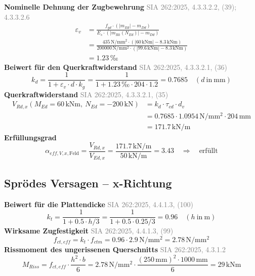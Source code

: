 \documentclass[11pt,a4paper]{article}
\newcommand{\normref}[1]{{\small\textcolor{gray}{#1}}}
\begin{document}
\noindent\textbf{Nominelle Dehnung der Zugbewehrung} \hfill \normref{SIA 262:2025, 4.3.3.2.2, (39); 4.3.3.2.6}
\begin{equation*}
\begin{aligned}
  \varepsilon_v &= \frac{f_{yd} \cdot \left(\left|m_{Ed}\right| - m_{Dd}\right)}{E_s \cdot \left(\left|m_{Rk}(N_{Ed})\right| - m_{Dd}\right)} \\
  &= \frac{435\,\mathrm{N}/\mathrm{mm}^{2} \cdot \left(\left|60\,\mathrm{kNm}\right| - 8.3\,\mathrm{kNm}\right)}{200000\,\mathrm{N}/\mathrm{mm}^{2} \cdot \left(\left|99.6\,\mathrm{kNm}\right| - 8.3\,\mathrm{kNm}\right)} \\
  &= 1.23\,\text{‰}
\end{aligned}
\end{equation*}
\noindent\textbf{Beiwert für den Querkraftwiderstand} \hfill \normref{SIA 262:2025, 4.3.3.2.1, (36)}
\begin{equation*}
k_d = \frac{1}{1 + \varepsilon_v \cdot d \cdot k_g} = \frac{1}{1 + 1.23\,\text{‰} \cdot 204 \cdot 1.2} = 0.7685 \quad \left(d\ \text{in}\ \mathrm{mm}\right)
\end{equation*}
\noindent\textbf{Querkraftwiderstand} \hfill \normref{SIA 262:2025, 4.3.3.2.1, (35)}
\begin{equation*}
\begin{aligned}
  V_{Rd,x}(M_{Ed} = 60\,\mathrm{kNm},\ N_{Ed} = -200\,\mathrm{kN}) &= k_d \cdot \tau_{cd} \cdot d_v \\
  &= 0.7685 \cdot 1.0954\,\mathrm{N}/\mathrm{mm}^{2} \cdot 204\,\mathrm{mm} \\
  &= 171.7\,\mathrm{kN}/\mathrm{m}
\end{aligned}
\end{equation*}
\noindent\textbf{Erfüllungsgrad}
\begin{equation*}
\alpha_{eff,V,x,\text{Feld}} = \frac{V_{Rd,x}}{V_{Ed,x}} = \frac{171.7\,\mathrm{kN}/\mathrm{m}}{50\,\mathrm{kN}/\mathrm{m}} = 3.43 \quad \Rightarrow \quad \text{erfüllt}
\end{equation*}
\subsection{Sprödes Versagen – x-Richtung}
\noindent\textbf{Beiwert für die Plattendicke} \hfill \normref{SIA 262:2025, 4.4.1.3, (100)}
\begin{equation*}
k_t = \frac{1}{1 + 0.5 \cdot h/3} = \frac{1}{1 + 0.5 \cdot 0.25/3} = 0.96 \quad \left(h\ \text{in}\ \mathrm{m}\right)
\end{equation*}
\noindent\textbf{Wirksame Zugfestigkeit} \hfill \normref{SIA 262:2025, 4.4.1.3, (99)}
\begin{equation*}
f_{ct,eff} = k_t \cdot f_{ctm} = 0.96 \cdot 2.9\,\mathrm{N}/\mathrm{mm}^{2} = 2.78\,\mathrm{N}/\mathrm{mm}^{2}
\end{equation*}
\noindent\textbf{Rissmoment des ungerissenen Querschnitts} \hfill \normref{SIA 262:2025, 4.3.1.2}
\begin{equation*}
M_{Riss} = f_{ct,eff} \cdot \frac{h^{2} \cdot b}{6} = 2.78\,\mathrm{N}/\mathrm{mm}^{2} \cdot \frac{\left(250\,\mathrm{mm}\right)^{2} \cdot 1000\,\mathrm{mm}}{6} = 29\,\mathrm{kNm}
\end{equation*}
\end{document}

